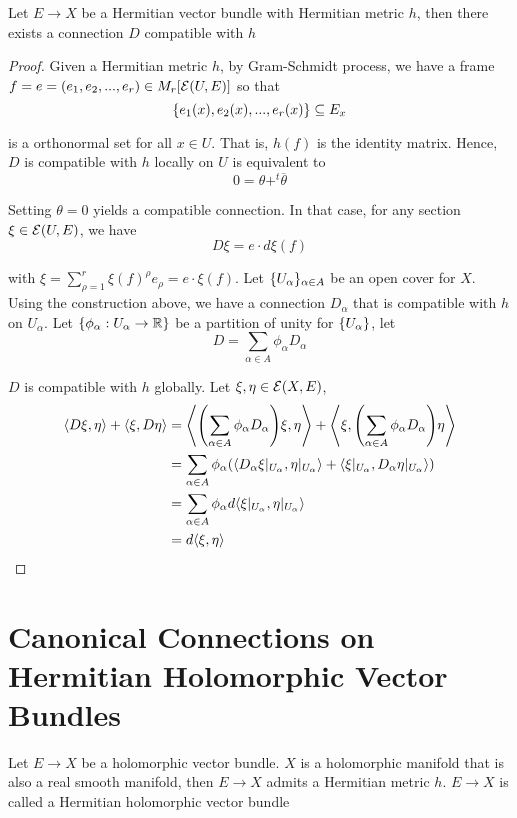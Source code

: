 \begin{proposition}
	Let $E \to X$ be a Hermitian vector bundle with Hermitian metric $h$, then there exists a connection $D$ compatible with $h$
	\begin{proof}
		Given a Hermitian metric $h$, by Gram-Schmidt process, we have a frame $f = e = (e_1, e_2, ..., e_r) \in M_r[\mathcal{E}(U, E)]$ so that
		$$
			\{e_1(x), e_2(x), ..., e_r(x)\} \subseteq E_x
		$$
		
		is a orthonormal set for all $x \in U$. That is, $h(f)$ is the identity matrix. Hence, $D$ is compatible with $h$ locally on $U$ is equivalent to
		$$
			0 = \theta + ^t\overline{\theta}
		$$
		
		Setting $\theta = 0$ yields a compatible connection. In that case, for any section $\xi \in \mathcal{E}(U, E)$, we have
		$$
			D \xi = e \cdot d \xi(f)
		$$
		
		with $\xi = \sum_{\rho=1}^r \xi(f)^\rho e_\rho = e \cdot \xi(f)$. Let $\{U_\alpha\}_{\alpha \in A}$ be an open cover for $X$. Using the construction above, we have a connection $D_\alpha$ that is compatible with $h$ on $U_\alpha$. Let $\{\phi_\alpha: U_\alpha \to \mathbb{R}\}$ be a partition of unity for $\{U_\alpha\}$, let
		$$
			D = \sum_{\alpha \in A} \phi_\alpha D_\alpha
		$$
		
		$D$ is compatible with $h$ globally. Let $\xi, \eta \in \mathcal{E}(X, E)$,
		\begin{align*}
			\inner{D \xi, \eta} + \inner{\xi, D \eta}
			&= \inner*{\tuple*{\sum_{\alpha \in A} \phi_\alpha D_\alpha} \xi, \eta} + \inner*{\xi, \tuple*{\sum_{\alpha \in A} \phi_\alpha D_\alpha} \eta} \\
			&= \sum_{\alpha \in A} \phi_\alpha (\inner{D_\alpha \xi\vert_{U_\alpha}, \eta\vert_{U_\alpha}} + \inner{\xi\vert_{U_\alpha}, D_\alpha \eta\vert_{U_\alpha}}) \\
			&= \sum_{\alpha \in A} \phi_\alpha d \inner{\xi\vert_{U_\alpha}, \eta\vert_{U_\alpha}} \\
			&= d \inner{\xi, \eta}
		\end{align*}
	\end{proof}
\end{proposition}

\section{Canonical Connections on Hermitian Holomorphic Vector Bundles}

\begin{definition}
	Let $E \to X$ be a holomorphic vector bundle.  $X$ is a holomorphic manifold that is also a real smooth manifold, then $E \to X$ admits a Hermitian metric $h$. $E \to X$ is called a Hermitian holomorphic vector bundle
\end{definition}

